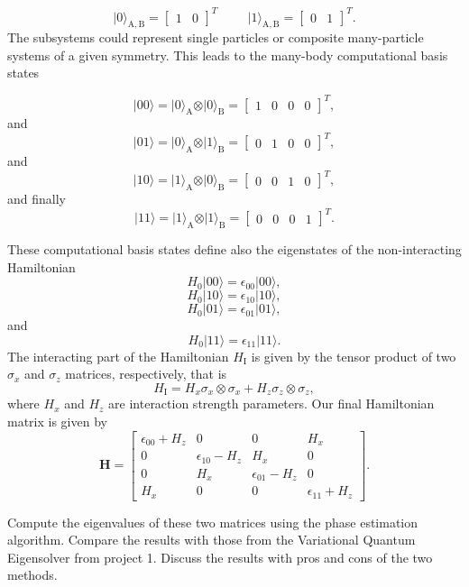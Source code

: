 \documentclass[%
oneside,                 %
final,                   %
10pt]{article}
\begin{document}
\[
\vert 0\rangle_{\mathrm{A,B}}=\begin{bmatrix} 1 & 0\end{bmatrix}^T \hspace{1cm} \vert 1\rangle_{\mathrm{A,B}}=\begin{bmatrix} 0 & 1\end{bmatrix}^T.
\]
The subsystems could represent single particles or composite many-particle systems of a given symmetry.
This leads to the many-body computational basis states

\[
\vert 00\rangle = \vert 0\rangle_{\mathrm{A}}\otimes \vert 0\rangle_{\mathrm{B}}=\begin{bmatrix} 1 & 0 & 0 &0\end{bmatrix}^T,
\]
and
\[
\vert 01\rangle = \vert 0\rangle_{\mathrm{A}}\otimes \vert 1\rangle_{\mathrm{B}}=\begin{bmatrix} 0 & 1 & 0 &0\end{bmatrix}^T,
\]
and
\[
\vert 10\rangle = \vert 1\rangle_{\mathrm{A}}\otimes \vert 0\rangle_{\mathrm{B}}=\begin{bmatrix} 0 & 0 & 1 &0\end{bmatrix}^T,
\]
and finally
\[
\vert 11\rangle = \vert 1\rangle_{\mathrm{A}}\otimes \vert 1\rangle_{\mathrm{B}}=\begin{bmatrix} 0 & 0 & 0 &1\end{bmatrix}^T.
\]

These computational basis states define also the eigenstates of the non-interacting  Hamiltonian
\[
H_0\vert 00 \rangle = \epsilon_{00}\vert 00 \rangle,
\]
\[
H_0\vert 10 \rangle = \epsilon_{10}\vert 10 \rangle,
\]
\[
H_0\vert 01 \rangle = \epsilon_{01}\vert 01 \rangle,
\]
and
\[
H_0\vert 11 \rangle = \epsilon_{11}\vert 11 \rangle.
\]
The interacting part of the Hamiltonian $H_{\mathrm{I}}$ is given by the tensor product of two $\sigma_x$ and $\sigma_z$  matrices, respectively, that is
\[
H_{\mathrm{I}}=H_x\sigma_x\otimes\sigma_x+H_z\sigma_z\otimes\sigma_z,
\]
where $H_x$ and $H_z$ are interaction strength parameters. Our final Hamiltonian matrix is given by
\[
\bm{H}=\begin{bmatrix} \epsilon_{00}+H_z & 0 & 0 & H_x \\
                       0  & \epsilon_{10}-H_z & H_x & 0 \\
		       0 & H_x & \epsilon_{01}-H_z & 0 \\
		       H_x & 0 & 0 & \epsilon_{11} +H_z \end{bmatrix}.
\] 

Compute the eigenvalues of these two matrices using the phase
estimation algorithm. Compare the results with those from the
Variational Quantum Eigensolver from project 1.  Discuss the results with pros and cons of the two methods.
\end{document}
